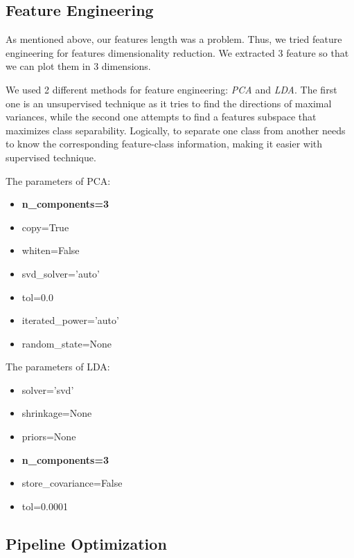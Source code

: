 \documentclass{article} %
\begin{document}
\subsection{Feature Engineering}

As mentioned above, our features length was a problem. Thus, we tried feature engineering for features dimensionality reduction. We extracted 3 feature so that we can plot them in 3 dimensions.

We used 2 different methods for feature engineering: \textit{PCA} and \textit{LDA}. The first one is an unsupervised technique as it tries to find the directions of maximal variances, while the second one attempts to find a features subspace that maximizes class separability. Logically, to separate one class from another needs to know the corresponding feature-class information, making it easier with supervised technique.

The parameters of PCA:
\begin{multicols}{2}
\begin{itemize}
    \item \textbf{n\_components=3}
    \item copy=True
    \item whiten=False
    \item svd\_solver='auto'
    \item tol=0.0
    \item iterated\_power='auto'
    \item random\_state=None
\end{itemize}
\end{multicols}

The parameters of LDA:
\begin{multicols}{2}
\begin{itemize}
    \item solver='svd'
    \item shrinkage=None
    \item priors=None
    \item \textbf{n\_components=3}
    \item store\_covariance=False
    \item tol=0.0001
\end{itemize}
\end{multicols}

\subsection{Pipeline Optimization}
\end{document}
